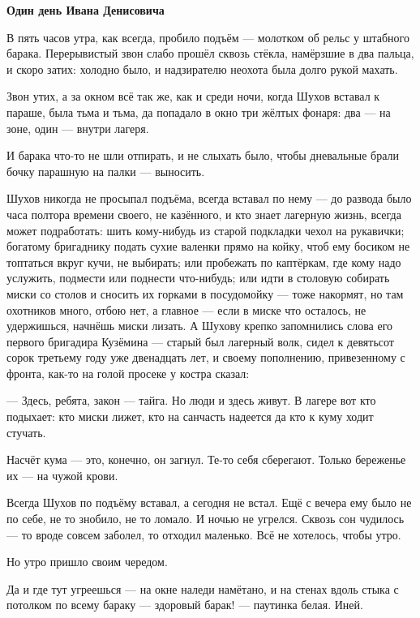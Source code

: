 

\centerline{\bf Один день Ивана Денисовича}

\bigskip

В пять часов утра, как всегда, пробило подъём --- молотком об рельс у штабного барака. Перерывистый звон слабо прошёл сквозь стёкла, намёрзшие в два пальца, и скоро затих: холодно было, и надзирателю неохота была долго рукой махать.

Звон утих, а за окном всё так же, как и среди ночи, когда Шухов вставал к параше, была тьма и тьма, да попадало в окно три жёлтых фонаря: два --- на зоне, один --- внутри лагеря.

И барака что-то не шли отпирать, и не слыхать было, чтобы дневальные брали бочку парашную на палки --- выносить.

Шухов никогда не просыпал подъёма, всегда вставал по нему --- до развода было часа полтора времени своего, не казённого, и кто знает лагерную жизнь, всегда может подработать: шить кому-нибудь из старой подкладки чехол на рукавички; богатому бригаднику подать сухие валенки прямо на койку, чтоб ему босиком не топтаться вкруг кучи, не выбирать; или пробежать по каптёркам, где кому надо услужить, подмести или поднести что-нибудь; или идти в столовую собирать миски со столов и сносить их горками в посудомойку --- тоже накормят, но там охотников много, отбою нет, а главное --- если в миске что осталось, не удержишься, начнёшь миски лизать. А Шухову крепко запомнились слова его первого бригадира Кузёмина --- старый был лагерный волк, сидел к девятьсот сорок третьему году уже двенадцать лет, и своему пополнению, привезенному с фронта, как-то на голой просеке у костра сказал:

--- Здесь, ребята, закон --- тайга. Но люди и здесь живут. В лагере вот кто подыхает: кто миски лижет, кто на санчасть надеется да кто к куму ходит стучать.

Насчёт кума --- это, конечно, он загнул. Те-то себя сберегают. Только береженье их --- на чужой крови.

Всегда Шухов по подъёму вставал, а сегодня не встал. Ещё с вечера ему было не по себе, не то знобило, не то ломало. И ночью не угрелся. Сквозь сон чудилось --- то вроде совсем заболел, то отходил маленько. Всё не хотелось, чтобы утро.

Но утро пришло своим чередом.

Да и где тут угреешься --- на окне наледи намётано, и на стенах вдоль стыка с потолком по всему бараку --- здоровый барак! --- паутинка белая. Иней.

